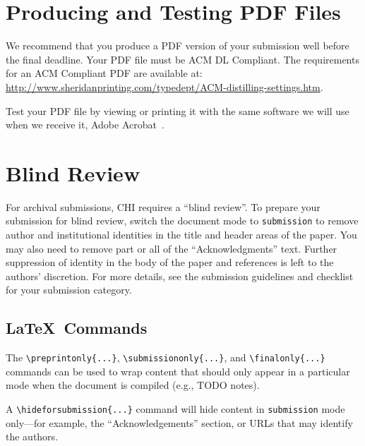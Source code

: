 \documentclass[preprint]{../latex/sigchi-modern}
\begin{document}
\section{Producing and Testing PDF Files}
We recommend that you produce a PDF version of your submission well
before the final deadline. Your PDF file must be ACM DL Compliant. The
requirements for an ACM Compliant PDF are available at:
{\url{http://www.sheridanprinting.com/typedept/ACM-distilling-settings.htm}}.

Test your PDF file by viewing or printing it with the same software we will use
when we receive it, Adobe Acrobat~\cite{acrobat}.

%
%
\balance

\section{Blind Review}
For archival submissions, CHI requires a ``blind review''. To prepare your
submission for blind review, switch the document mode to \texttt{submission} to
remove author and institutional identities in the title and header areas of the
paper. You may also need to remove part or all of the ``Acknowledgments'' text.
Further suppression of identity in the body of the paper and references is left
to the authors' discretion. For more details, see the submission guidelines and
checklist for your submission category.

\subsection{\LaTeX\ Commands}
The \texttt{\textbackslash preprintonly\{...\}},
\texttt{\textbackslash sub\-mis\-sion\-only\{...\}}, and
\texttt{\textbackslash finalonly\{...\}} commands can be used to wrap content
that should only appear in a particular mode when the document is compiled
(e.g., TODO notes).

A \texttt{\textbackslash hideforsubmission\{...\}} command will hide content
in \texttt{submission} mode only---for example, the ``Acknowledgements''
section, or URLs that may identify the authors.
\end{document}
